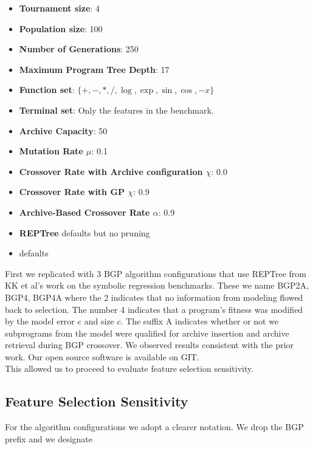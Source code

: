 \begin{itemize}
\item \textbf{Tournament size}: 4
\item \textbf{Population size}: 100
\item \textbf{Number of Generations}: 250
\item \textbf{Maximum Program Tree Depth}: 17
\item \textbf{Function set}: $\{ +, -, *, /, \log, \exp, \sin, \cos, -x \}$
\item \textbf{Terminal set}: Only the features in the benchmark.
\item \textbf{Archive Capacity}: 50
\item \textbf{Mutation Rate $\mu$}: 0.1
\item \textbf{Crossover Rate with Archive configuration $\chi$}: 0.0
\item \textbf{Crossover Rate with GP $\chi$}: 0.9
\item \textbf{Archive-Based Crossover Rate $\alpha$}: 0.9
\item \textbf{REPTree}  defaults but no pruning
\item \textbf{\SCIKIT} defaults
\end{itemize}

First we replicated with 3 BGP algorithm configurations that use REPTree from KK et al's work on the symbolic regression benchmarks. These we name BGP2A, BGP4, BGP4A where the 2 indicates that no information from modeling flowed back to selection. The number 4 indicates that a program's fitness was modified by the model error $e$ and size $c$.   The suffix A indicates whether or not we subprograms from the model were qualified for archive insertion and archive retrieval during BGP crossover. We observed results consistent with the prior work. Our open source software is available on GIT.\\

This allowed us to proceed to evaluate feature selection sensitivity.

\subsection{Feature Selection Sensitivity}\label{sect:ftr-select}


%

For the algorithm configurations we adopt a clearer notation. We drop the BGP prefix and we designate 

